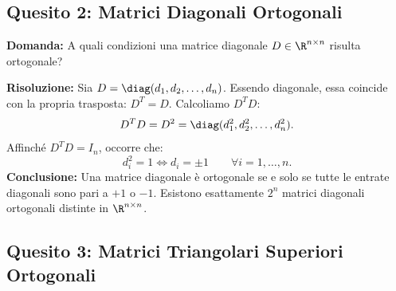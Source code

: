 \subsection{Quesito 2: Matrici Diagonali Ortogonali}

\begin{example}
\textbf{Domanda:} A quali condizioni una matrice diagonale $D \in \R^{n \times n}$ risulta ortogonale?

\textbf{Risoluzione:} Sia $D = \diag(d_1, d_2, \dots, d_n)$. Essendo diagonale, essa coincide con la propria trasposta: $D^T = D$. Calcoliamo $D^T D$:
\begin{equation}
    D^T D = D^2 = \diag(d_1^2, d_2^2, \dots, d_n^2).
\end{equation}
Affinch\'e $D^T D = I_n$, occorre che:
\begin{equation}
    d_i^2 = 1 \iff d_i = \pm 1 \qquad \forall i = 1, \dots, n.
\end{equation}
\textbf{Conclusione:} Una matrice diagonale \`e ortogonale se e solo se tutte le entrate diagonali sono pari a $+1$ o $-1$. Esistono esattamente $2^n$ matrici diagonali ortogonali distinte in $\R^{n \times n}$.
\end{example}

\subsection{Quesito 3: Matrici Triangolari Superiori Ortogonali}

